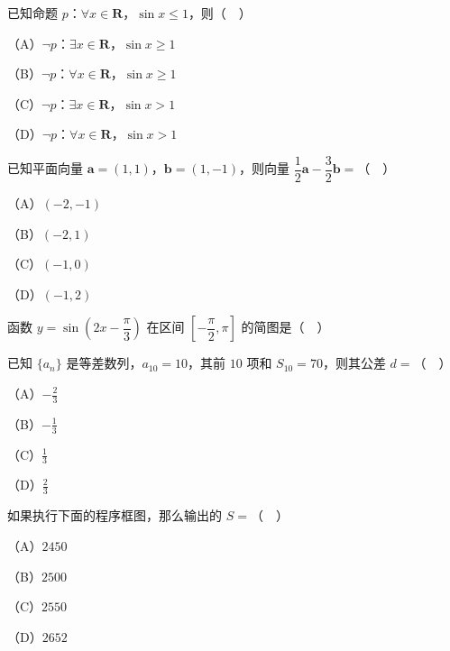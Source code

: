 


\begin{question}
已知命题 $p$：$\forall x\in\mathbf R$，$\sin x\leqslant1$，则（　）

（A）$\neg p$：$\exists x\in\mathbf R$，$\sin x\geqslant1$

（B）$\neg p$：$\forall x\in\mathbf R$，$\sin x\geqslant1$

（C）$\neg p$：$\exists x\in\mathbf R$，$\sin x>1$

（D）$\neg p$：$\forall x\in\mathbf R$，$\sin x>1$

\end{question}
\begin{question}
已知平面向量 $\boldsymbol a=(1,1)$，$\boldsymbol b=(1,-1)$，则向量 $\dfrac12\boldsymbol a-\dfrac32\boldsymbol b=$（　）

（A）$(-2,-1)$

（B）$(-2,1)$

（C）$(-1,0)$

（D）$(-1,2)$

\Needspace{0.4\textheight}
\end{question}
\begin{question}
函数 $y=\sin\left(2x-\dfrac{\pi}{3}\right)$ 在区间 $\left[-\dfrac{\pi}{2},\pi\right]$ 的简图是（　）
\nopagebreak[4]
\begin{center}\end{center}
\nopagebreak[4]
\end{question}
\begin{question}
已知 $\{a_n\}$ 是等差数列，$a_{10}=10$，其前 $10$ 项和 $S_{10}=70$，则其公差 $d=$（　）

（A）$-\frac23$

（B）$-\frac13$

（C）$\frac13$

（D）$\frac23$

\Needspace{0.4\textheight}
\end{question}
\begin{question}
如果执行下面的程序框图，那么输出的 $S=$（　）
\nopagebreak[4]
\begin{center}\end{center}
\nopagebreak[4]
（A）$2450$

（B）$2500$

（C）$2550$

（D）$2652$

\end{question}
